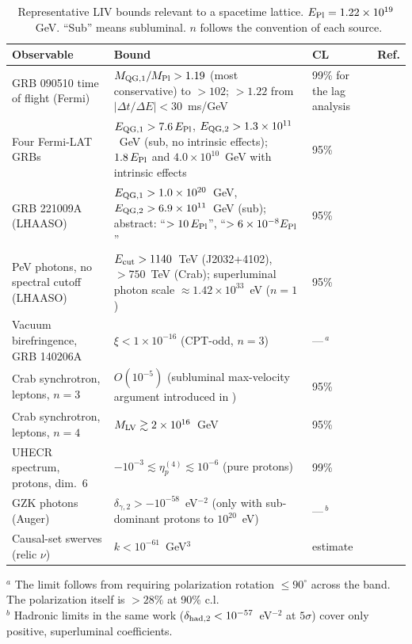 \begin{table}[t]
\centering
\small
\caption{Representative LIV bounds relevant to a spacetime lattice. $E_{\rm Pl}=1.22\times10^{19}$~GeV. ``Sub'' means subluminal. $n$ follows the convention of each source.}
\label{tab:lattice-liv:bounds}
\begin{tabular}{p{3.6cm}p{5.4cm}p{1.6cm}p{2.2cm}}
\hline
Observable & Bound & CL & Ref.\\
\hline
GRB 090510 time of flight (Fermi) & $M_{\rm QG,1}/M_{\rm Pl}>1.19$ (most conservative) to $>102$; $>1.22$ from $|\Delta t/\Delta E|<30$~ms/GeV & 99\% for the lag analysis & \cite{Abdo2009limit}\\
Four Fermi-LAT GRBs & $E_{\rm QG,1}>7.6\,E_{\rm Pl}$, $E_{\rm QG,2}>1.3\times10^{11}$~GeV (sub, no intrinsic effects); $1.8\,E_{\rm Pl}$ and $4.0\times10^{10}$~GeV with intrinsic effects & 95\% & \cite{Vasileiou2013constraints}\\
GRB 221009A (LHAASO) & $E_{\rm QG,1}>1.0\times10^{20}$~GeV, $E_{\rm QG,2}>6.9\times10^{11}$~GeV (sub); abstract: ``$>10\,E_{\rm Pl}$'', ``$>6\times10^{-8}E_{\rm Pl}$'' & 95\% & \cite{LHAASO2024stringent}\\
PeV photons, no spectral cutoff (LHAASO) & $E_{\rm cut}>1140$~TeV (J2032+4102), $>750$~TeV (Crab); superluminal photon scale $\approx1.42\times10^{33}$~eV ($n=1$) & 95\% & \cite{LHAASO2022exploring}\\
Vacuum birefringence, GRB 140206A & $\xi<1\times10^{-16}$ (CPT-odd, $n=3$) & ---\,$^a$ & \cite{Gotz2014grb}\\
Crab synchrotron, leptons, $n=3$ & $O(10^{-5})$ (subluminal max-velocity argument introduced in \cite{Jacobson2003strong}) & 95\% & \cite{Maccione2007new}\\
Crab synchrotron, leptons, $n=4$ & $M_{\rm LV}\gtrsim2\times10^{16}$~GeV & 95\% & \cite{Liberati2012scale}\\
UHECR spectrum, protons, dim.~6 & $-10^{-3}\lesssim\eta_p^{(4)}\lesssim10^{-6}$ (pure protons) & 99\% & \cite{Maccione2009planck,Liberati2013tests}\\
GZK photons (Auger) & $\delta_{\gamma,2}>-10^{-58}$~eV$^{-2}$ (only with sub-dominant protons to $10^{20}$~eV) & ---\,$^b$ & \cite{PierreAuger2022testing}\\
Causal-set swerves (relic $\nu$) & $k<10^{-61}$~GeV$^3$ & estimate & \cite{Kaloper2006low}\\
\hline
\end{tabular}

\smallskip
\raggedright\footnotesize
$^a$ The limit follows from requiring polarization rotation $\le90^\circ$ across the band. The polarization itself is $>28\%$ at 90\% c.l. \\
$^b$ Hadronic limits in the same work ($\delta_{\rm had,2}<10^{-57}$~eV$^{-2}$ at $5\sigma$) cover only positive, superluminal coefficients.
\end{table}

